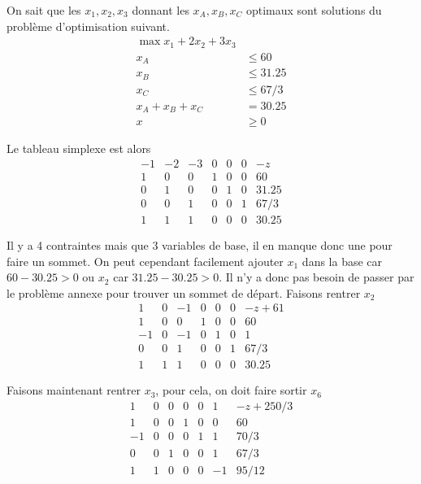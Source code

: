 \begin{enumerate}
\begin{solution}
      On sait que les $x_1,x_2,x_3$ donnant les $x_A,x_B,x_C$ optimaux
      sont solutions du problème d'optimisation suivant.
      \begin{align*}
        \max x_1 + 2x_2 + 3x_3\\
        x_A & \leq 60\\
        x_B & \leq 31.25\\
        x_C & \leq 67/3\\
        x_A + x_B + x_C & = 30.25\\
        x & \geq 0
      \end{align*}

      Le tableau simplexe est alors
      \[
        \begin{array}{cccccc|l}
          -1 & -2 & -3 & 0 & 0 & 0 & -z\\
          \hline
          1 & 0 & 0 & 1 & 0 & 0 & 60\\
          0 & 1 & 0 & 0 & 1 & 0 & 31.25\\
          0 & 0 & 1 & 0 & 0 & 1 & 67/3\\
          1 & 1 & 1 & 0 & 0 & 0 & 30.25
        \end{array}
      \]

      Il y a 4 contraintes mais que 3 variables de base, il en manque donc
      une pour faire un sommet.
      On peut cependant facilement ajouter $x_1$ dans la base
      car $60-30.25 > 0$ ou $x_2$ car $31.25-30.25 >0 $.
      Il n'y a donc pas besoin de passer par le problème annexe pour trouver
      un sommet de départ.
      Faisons rentrer $x_2$
      \[
        \begin{array}{cccccc|l}
           1 & 0 & -1 & 0 & 0 & 0 & -z + 61\\
          \hline
           1 & 0 &  0 & 1 & 0 & 0 & 60\\
          -1 & 0 & -1 & 0 & 1 & 0 & 1\\
           0 & 0 &  1 & 0 & 0 & 1 & 67/3\\
           1 & 1 &  1 & 0 & 0 & 0 & 30.25
        \end{array}
      \]

      Faisons maintenant rentrer $x_3$, pour cela, on doit faire sortir $x_6$
      \[
        \begin{array}{cccccc|l}
           1 & 0 & 0 & 0 & 0 &  1 & -z + 250/3\\
          \hline
           1 & 0 & 0 & 1 & 0 &  0 & 60\\
          -1 & 0 & 0 & 0 & 1 &  1 & 70/3\\
           0 & 0 & 1 & 0 & 0 &  1 & 67/3\\
           1 & 1 & 0 & 0 & 0 & -1 & 95/12
        \end{array}
      \]


\end{solution}
\end{enumerate}
